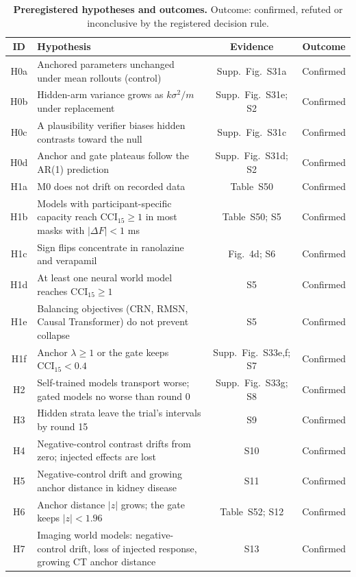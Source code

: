 \documentclass[11pt,a4paper]{article}
\newcommand{\CCI}{\mathrm{CCI}}
\begin{document}
\FloatBarrier
\begin{table}[!htbp]\centering\scriptsize
\caption{\textbf{Preregistered hypotheses and outcomes.} Outcome: confirmed, refuted or inconclusive by the registered decision rule.}\label{tab:hyp}
\begin{tabularx}{\textwidth}{@{}c Y c c@{}}\toprule
ID & Hypothesis & Evidence & Outcome\\\midrule
H0a & Anchored parameters unchanged under mean rollouts (control) & Supp.\ Fig.~S31a & Confirmed\\
H0b & Hidden-arm variance grows as $k\sigma^2/m$ under replacement & Supp.\ Fig.~S31e; S2 & Confirmed\\
H0c & A plausibility verifier biases hidden contrasts toward the null & Supp.\ Fig.~S31c & Confirmed\\
H0d & Anchor and gate plateaus follow the AR(1) prediction & Supp.\ Fig.~S31d; S2 & Confirmed\\
H1a & M0 does not drift on recorded data & Table~S50 & Confirmed\\
H1b & Models with participant-specific capacity reach $\CCI_{15}\ge1$ in most masks with $|\Delta F|<1$ ms & Table~S50; S5 & Confirmed\\
H1c & Sign flips concentrate in ranolazine and verapamil & Fig.~4d; S6 & Confirmed\\
H1d & At least one neural world model reaches $\CCI_{15}\ge1$ & S5 & Confirmed\\
H1e & Balancing objectives (CRN, RMSN, Causal Transformer) do not prevent collapse & S5 & Confirmed\\
H1f & Anchor $\lambda\ge1$ or the gate keeps $\CCI_{15}<0.4$ & Supp.\ Fig.~S33e,f; S7 & Confirmed\\
H2 & Self-trained models transport worse; gated models no worse than round 0 & Supp.\ Fig.~S33g; S8 & Confirmed\\
H3 & Hidden strata leave the trial's intervals by round 15 & S9 & Confirmed\\
H4 & Negative-control contrast drifts from zero; injected effects are lost & S10 & Confirmed\\
H5 & Negative-control drift and growing anchor distance in kidney disease & S11 & Confirmed\\
H6 & Anchor distance $|z|$ grows; the gate keeps $|z|<1.96$ & Table~S52; S12 & Confirmed\\
H7 & Imaging world models: negative-control drift, loss of injected response, growing CT anchor distance & S13 & Confirmed\\

\end{tabularx}
\end{table}
\end{document}
